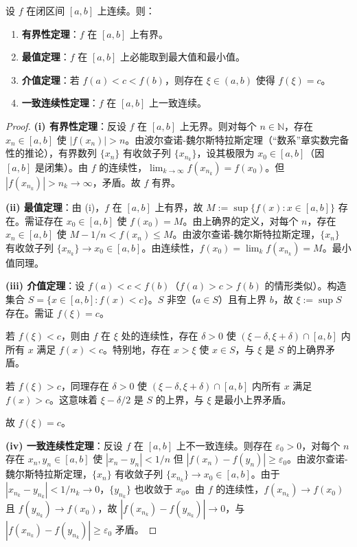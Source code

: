 \begin{theorem}[闭区间上连续函数的性质]\label{thm:continuous_closed_interval}
设 $f$ 在闭区间 $[a,b]$ 上连续。则：
\begin{enumerate}[label=(\roman*)]
    \item \textbf{有界性定理}：$f$ 在 $[a,b]$ 上有界。
    \item \textbf{最值定理}：$f$ 在 $[a,b]$ 上必能取到最大值和最小值。
    \item \textbf{介值定理}：若 $f(a) < c < f(b)$，则存在 $\xi \in (a,b)$ 使得 $f(\xi) = c$。
    \item \textbf{一致连续性定理}：$f$ 在 $[a,b]$ 上一致连续。
\end{enumerate}
\end{theorem}

\begin{proof}
\textbf{(i) 有界性定理}：反设 $f$ 在 $[a,b]$ 上无界。则对每个 $n \in \mathbb{N}$，存在 $x_n \in [a,b]$ 使 $|f(x_n)| > n$。由波尔查诺-魏尔斯特拉斯定理（“数系”章实数完备性的推论），有界数列 $\{x_n\}$ 有收敛子列 $\{x_{n_k}\}$，设其极限为 $x_0 \in [a,b]$（因 $[a,b]$ 是闭集）。由 $f$ 的连续性，$\lim_{k\to\infty} f(x_{n_k}) = f(x_0)$。但 $|f(x_{n_k})| > n_k \to \infty$，矛盾。故 $f$ 有界。

\textbf{(ii) 最值定理}：由 (i)，$f$ 在 $[a,b]$ 上有界，故 $M := \sup\{f(x) : x \in [a,b]\}$ 存在。需证存在 $x_0 \in [a,b]$ 使 $f(x_0) = M$。由上确界的定义，对每个 $n$，存在 $x_n \in [a,b]$ 使 $M - 1/n < f(x_n) \le M$。由波尔查诺-魏尔斯特拉斯定理，$\{x_n\}$ 有收敛子列 $\{x_{n_k}\} \to x_0 \in [a,b]$。由连续性，$f(x_0) = \lim_{k} f(x_{n_k}) = M$。最小值同理。

\textbf{(iii) 介值定理}：设 $f(a) < c < f(b)$（$f(a) > c > f(b)$ 的情形类似）。构造集合 $S = \{x \in [a,b] : f(x) < c\}$。$S$ 非空（$a \in S$）且有上界 $b$，故 $\xi := \sup S$ 存在。需证 $f(\xi) = c$。

若 $f(\xi) < c$，则由 $f$ 在 $\xi$ 处的连续性，存在 $\delta > 0$ 使 $(\xi-\delta, \xi+\delta) \cap [a,b]$ 内所有 $x$ 满足 $f(x) < c$。特别地，存在 $x > \xi$ 使 $x \in S$，与 $\xi$ 是 $S$ 的上确界矛盾。

若 $f(\xi) > c$，同理存在 $\delta > 0$ 使 $(\xi-\delta, \xi+\delta) \cap [a,b]$ 内所有 $x$ 满足 $f(x) > c$。这意味着 $\xi - \delta/2$ 是 $S$ 的上界，与 $\xi$ 是最小上界矛盾。

故 $f(\xi) = c$。

\textbf{(iv) 一致连续性定理}：反设 $f$ 在 $[a,b]$ 上不一致连续。则存在 $\varepsilon_0 > 0$，对每个 $n$ 存在 $x_n, y_n \in [a,b]$ 使 $|x_n - y_n| < 1/n$ 但 $|f(x_n) - f(y_n)| \ge \varepsilon_0$。由波尔查诺-魏尔斯特拉斯定理，$\{x_n\}$ 有收敛子列 $\{x_{n_k}\} \to x_0 \in [a,b]$。由于 $|x_{n_k} - y_{n_k}| < 1/n_k \to 0$，$\{y_{n_k}\}$ 也收敛于 $x_0$。由 $f$ 的连续性，$f(x_{n_k}) \to f(x_0)$ 且 $f(y_{n_k}) \to f(x_0)$，故 $|f(x_{n_k}) - f(y_{n_k})| \to 0$，与 $|f(x_{n_k}) - f(y_{n_k})| \ge \varepsilon_0$ 矛盾。
\end{proof}

